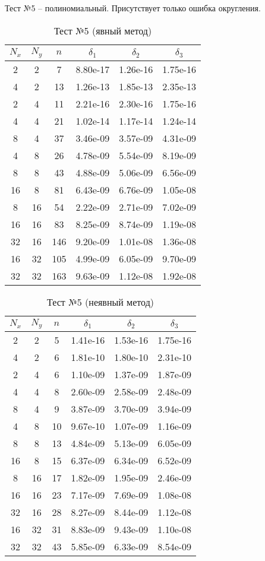 \newpage
Тест №5 -- полиномиальный. Присутствует только ошибка округления.
\begin{table}[H]
	\centering
	\begin{tabular}{*6c}
		\toprule
		$N_x$ & $N_y$ & $n$ & $\delta_1$ & $\delta_2$ & $\delta_3$ \\
		\midrule
		2 & 2 & 7 & 8.80e-17 & 1.26e-16 & 1.75e-16 \\
		4 & 2 & 13 & 1.26e-13 & 1.85e-13 & 2.35e-13 \\
		2 & 4 & 11 & 2.21e-16 & 2.30e-16 & 1.75e-16 \\
		4 & 4 & 21 & 1.02e-14 & 1.17e-14 & 1.24e-14 \\
		8 & 4 & 37 & 3.46e-09 & 3.57e-09 & 4.31e-09 \\
		4 & 8 & 26 & 4.78e-09 & 5.54e-09 & 8.19e-09 \\
		8 & 8 & 43 & 4.88e-09 & 5.06e-09 & 6.56e-09 \\
		16 & 8 & 81 & 6.43e-09 & 6.76e-09 & 1.05e-08 \\
		8 & 16 & 54 & 2.22e-09 & 2.71e-09 & 7.02e-09 \\
		16 & 16 & 83 & 8.25e-09 & 8.74e-09 & 1.19e-08 \\
		32 & 16 & 146 & 9.20e-09 & 1.01e-08 & 1.36e-08 \\
		16 & 32 & 105 & 4.99e-09 & 6.05e-09 & 9.70e-09 \\
		32 & 32 & 163 & 9.63e-09 & 1.12e-08 & 1.92e-08 \\
		\bottomrule
	\end{tabular}
	\caption{Тест №5 (явный метод)}
\end{table}
\begin{table}[H]
	\centering
	\begin{tabular}{*6c}
		\toprule
		$N_x$ & $N_y$ & $n$ & $\delta_1$ & $\delta_2$ & $\delta_3$ \\
		\midrule
		2 & 2 & 5 & 1.41e-16 & 1.53e-16 & 1.75e-16 \\
		4 & 2 & 6 & 1.81e-10 & 1.80e-10 & 2.31e-10 \\
		2 & 4 & 6 & 1.10e-09 & 1.37e-09 & 1.87e-09 \\
		4 & 4 & 8 & 2.60e-09 & 2.58e-09 & 2.48e-09 \\
		8 & 4 & 9 & 3.87e-09 & 3.70e-09 & 3.94e-09 \\
		4 & 8 & 10 & 9.67e-10 & 1.07e-09 & 1.16e-09 \\
		8 & 8 & 13 & 4.84e-09 & 5.13e-09 & 6.05e-09 \\
		16 & 8 & 15 & 6.37e-09 & 6.34e-09 & 6.52e-09 \\
		8 & 16 & 17 & 1.82e-09 & 1.95e-09 & 2.46e-09 \\
		16 & 16 & 23 & 7.17e-09 & 7.69e-09 & 1.08e-08 \\
		32 & 16 & 28 & 8.27e-09 & 8.44e-09 & 1.12e-08 \\
		16 & 32 & 31 & 8.83e-09 & 9.43e-09 & 1.10e-08 \\
		32 & 32 & 43 & 5.85e-09 & 6.33e-09 & 8.54e-09 \\
		\bottomrule
	\end{tabular}
	\caption{Тест №5 (неявный метод)}
\end{table}

